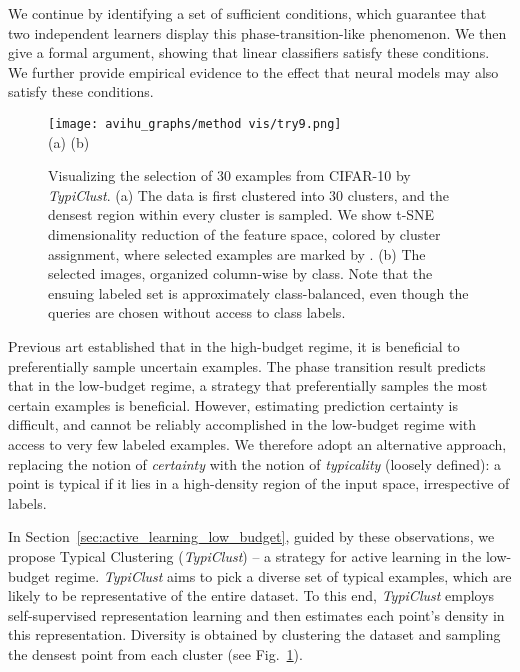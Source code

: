 \documentclass{article}
\begin{document}
We continue by identifying a set of sufficient conditions, which guarantee that two independent learners display this phase-transition-like phenomenon. We then give a formal argument, showing that linear classifiers satisfy these conditions. We further provide empirical evidence to the effect that neural models may also satisfy these conditions. 

\begin{figure}[b!]
\begin{center}
\vspace{-0.3cm}
\texttt{[image: avihu\_graphs/method vis/try9.png]} \\
\footnotesize{(a) \hspace{3.5cm} (b) \hspace{1.5cm}}
\vspace{-0.2cm}
\caption{Visualizing the selection of 30 examples from CIFAR-10 by \emph{TypiClust}. (a) The data is first clustered into 30 clusters, and the densest region within every cluster is sampled. We show t-SNE dimensionality reduction of the feature space, colored by cluster assignment, where selected examples are marked by . (b) The selected images, organized column-wise by class. Note that the ensuing labeled set is approximately class-balanced, even though the queries are chosen without access to class labels.}
\label{fig:cifar10_examples}
\end{center}
\end{figure}

Previous art established that in the high-budget regime, it is beneficial to preferentially sample uncertain examples. The phase transition result predicts that in the low-budget regime, a strategy that preferentially samples the most certain examples is beneficial. However, estimating prediction certainty is difficult, and cannot be reliably accomplished in the low-budget regime with access to very few labeled examples. We therefore adopt an alternative approach, replacing the notion of \emph{certainty} with the notion of \emph{typicality} (loosely defined): a point is typical if it lies in a high-density region of the input space, irrespective of labels. 

In Section~\ref{sec:active_learning_low_budget}, guided by these observations, we propose Typical Clustering (\emph{TypiClust}) -- a strategy for active learning in the low-budget regime. \emph{TypiClust} aims to pick a diverse set of typical examples, which are likely to be representative of the entire dataset. To this end, \emph{TypiClust} employs self-supervised representation learning and then estimates each point's density in this representation. Diversity is obtained by clustering the dataset and sampling the densest point from each cluster (see Fig.~\ref{fig:cifar10_examples}). 
\end{document}
